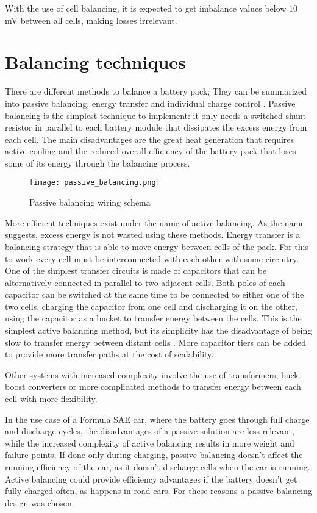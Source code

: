 With the use of cell balancing, it is expected to get imbalance values below 10 mV between all cells, making losses irrelevant.

\section{Balancing techniques}
There are different methods to balance a battery pack; They can be summarized into passive balancing, energy transfer and individual charge control \cite{6966514}.
Passive balancing is the simplest technique to implement: it only needs a switched shunt resistor in parallel to each battery module that dissipates the excess energy from each cell. The main disadvantages are the great heat generation that requires active cooling and the reduced overall efficiency of the battery pack that loses some of its energy through the balancing process.
\begin{figure}[h]
    \centering
    \texttt{[image: passive\_balancing.png]}
    \caption{Passive balancing wiring schema}
    \label{fig:passive_balancing}
\end{figure}

More efficient techniques exist under the name of active balancing. As the name suggests, excess energy is not wasted using these methods.
Energy transfer is a balancing strategy that is able to move energy between cells of the pack. For this to work every cell must be interconnected with each other with some circuitry. One of the simplest transfer circuits is made of capacitors that can be alternatively connected in parallel to two adjacent cells. Both poles of each capacitor can be switched at the same time to be connected to either one of the two cells, charging the capacitor from one cell and discharging it on the other, using the capacitor as a bucket to transfer energy between the cells. This is the simplest active balancing method, but its simplicity has the disadvantage of being slow to transfer energy between distant cells \cite{6966514}. More capacitor tiers can be added to provide more transfer paths at the cost of scalability.

Other systems with increased complexity involve the use of transformers, buck-boost converters or more complicated methods to transfer energy between each cell with more flexibility.

In the use case of a Formula SAE car, where the battery goes through full charge and discharge cycles, the disadvantages of a passive solution are less relevant, while the increased complexity of active balancing results in more weight and failure points. If done only during charging, passive balancing doesn't affect the running efficiency of the car, as it doesn't discharge cells when the car is running. Active balancing could provide efficiency advantages if the battery doesn't get fully charged often, as happens in road cars. For these reasons a passive balancing design was chosen.

